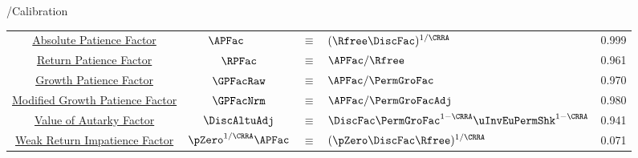 \documentclass[\econtexRoot/Endo]{subfiles}
\providecommand{\TblBox}{}\providecommand{\TblName}{}
\renewcommand{\TblName}{Calibration}
\begin{document}
\begin{verbatimwrite}{\TableDir/\TblName}
\begin{table}
{\begin{tabular}{|c|ccl|c|}
        \hyperlink{APFacDefn}{Absolute Patience Factor}                    & $\APFac_{\phantom{\Rfree}} $ & $\equiv$ & $ (\Rfree \DiscFac)^{1/\CRRA}$                & 0.999 \\
        \hyperlink{RPFacDefn}{Return Patience Factor}                      & $\RPFac$ & $\equiv$ & $\APFac/\Rfree $     & 0.961 \\
        \hyperlink{GPFacRawDefn}{\phantom{Modified }Growth Patience Factor}    & $\GPFacRaw$ & $\equiv$ & $\APFac/\PermGroFac $      & 0.970 \\
        \hyperlink{GPFacRawDefn}{Modified Growth Patience Factor}                      & $\GPFacNrm$ & $\equiv$ & $ \APFac/\PermGroFacAdj$& 0.980 \\
        \hyperlink{VAFacDefn}{Value of Autarky Factor}         & $\DiscAltuAdj $ & $\equiv$ & $ \DiscFac \PermGroFac^{1-\CRRA}\uInvEuPermShk^{1-\CRRA}$       & 0.941 \\ 
        \hyperlink{WRIC}{Weak Return Impatience Factor}         & $\pZero^{1/\CRRA} \APFac $ & $\equiv$ & $ (\pZero \DiscFac \Rfree)^{1/\CRRA}$       & 0.071 \\ \hline
      \end{tabular}
    } %

    \settowidth\TableWidth{\usebox{\TblBox}}
    \savebox{\TblShrunkBox}{
      \settowidth{\TblShrunk}{\usebox{\TblBox}}
      \resizebox{0.9\textwidth}{!}{\begin{minipage}{\TblShrunk}
          \usebox{\TblBox}
        \end{minipage}}
    }

    \usebox{\TblShrunkBox}


  \end{table}
\end{verbatimwrite}
\clearpage

\end{document}
